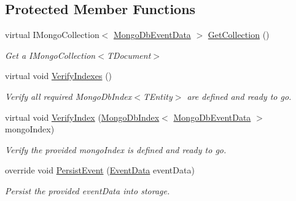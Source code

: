 \subsection*{Protected Member Functions}
\begin{DoxyCompactItemize}
\item 
virtual I\+Mongo\+Collection$<$ \hyperlink{classCqrs_1_1MongoDB_1_1Events_1_1MongoDbEventData}{Mongo\+Db\+Event\+Data} $>$ \hyperlink{classCqrs_1_1MongoDB_1_1Events_1_1MongoDbEventStore_aa6a9499aa1dcde55d82d8e0f3b5bd077_aa6a9499aa1dcde55d82d8e0f3b5bd077}{Get\+Collection} ()
\begin{DoxyCompactList}\small\item\em Get a I\+Mongo\+Collection$<$\+T\+Document$>$ \end{DoxyCompactList}\item 
virtual void \hyperlink{classCqrs_1_1MongoDB_1_1Events_1_1MongoDbEventStore_a60ae02928a3ae8cb99d46f6c340b5138_a60ae02928a3ae8cb99d46f6c340b5138}{Verify\+Indexes} ()
\begin{DoxyCompactList}\small\item\em Verify all required Mongo\+Db\+Index$<$\+T\+Entity$>$ are defined and ready to go. \end{DoxyCompactList}\item 
virtual void \hyperlink{classCqrs_1_1MongoDB_1_1Events_1_1MongoDbEventStore_a6a6f0303cd412974d90be87d281e81f5_a6a6f0303cd412974d90be87d281e81f5}{Verify\+Index} (\hyperlink{classCqrs_1_1MongoDB_1_1DataStores_1_1Indexes_1_1MongoDbIndex}{Mongo\+Db\+Index}$<$ \hyperlink{classCqrs_1_1MongoDB_1_1Events_1_1MongoDbEventData}{Mongo\+Db\+Event\+Data} $>$ mongo\+Index)
\begin{DoxyCompactList}\small\item\em Verify the provided {\itshape mongo\+Index}  is defined and ready to go. \end{DoxyCompactList}\item 
override void \hyperlink{classCqrs_1_1MongoDB_1_1Events_1_1MongoDbEventStore_a13f6823671d7cb9c042d8f7156a51b89_a13f6823671d7cb9c042d8f7156a51b89}{Persist\+Event} (\hyperlink{classCqrs_1_1Events_1_1EventData}{Event\+Data} event\+Data)
\begin{DoxyCompactList}\small\item\em Persist the provided {\itshape event\+Data}  into storage. \end{DoxyCompactList}\end{DoxyCompactItemize}
